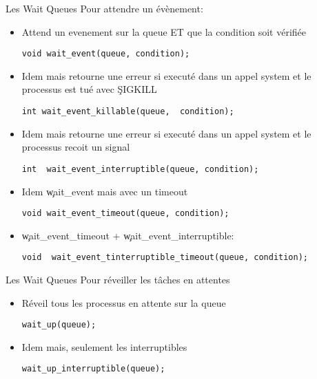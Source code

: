 \begin{frame}[fragile=singleslide]{Les Wait Queues}
  Pour attendre un évènement:
    \begin{itemize} 
    \item Attend  un evenement sur la  queue ET que  la condition soit
      vérifiée
      \begin{lstlisting} 
void wait_event(queue, condition);
      \end{lstlisting} 
    \item  Idem mais  retourne une  erreur  si executé  dans un  appel
      system et le processus est tué avec \c{SIGKILL}
      \begin{lstlisting} 
int wait_event_killable(queue,  condition);
      \end{lstlisting} 
    \item  Idem mais  retourne une  erreur  si executé  dans un  appel
      system et le processus recoit un signal
      \begin{lstlisting} 
int  wait_event_interruptible(queue, condition);
      \end{lstlisting} 
    \item   Idem
      \c{wait_event} mais avec un timeout
      \begin{lstlisting} 
void wait_event_timeout(queue, condition);
      \end{lstlisting} 
    \item \c{wait_event_timeout} + \c{wait_event_interruptible}:
      \begin{lstlisting} 
void  wait_event_tinterruptible_timeout(queue, condition);
      \end{lstlisting} 
    \end{itemize}    
\end{frame}

\begin{frame}[fragile=singleslide]{Les Wait Queues}
  Pour réveiller les tâches en attentes
    \begin{itemize}
    \item Réveil tous les processus en attente sur la queue
      \begin{lstlisting} 
wait_up(queue); 
      \end{lstlisting} 
    \item Idem mais, seulement les interruptibles
      \begin{lstlisting}
wait_up_interruptible(queue);
      \end{lstlisting} 
    \end{itemize}
\end{frame} 

